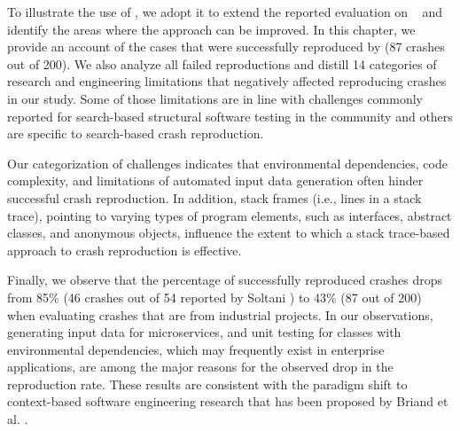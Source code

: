 To illustrate the use of \crashpack, we adopt it to extend the reported evaluation on \evocrash~\cite{soltani2017} and identify the areas where the approach can be improved.
In this chapter, we provide an account of the cases that were successfully reproduced by \evocrash (87 crashes out of 200). 
We also analyze all failed reproductions and distill 14 categories of research and engineering limitations that negatively affected reproducing crashes in our study. 
Some of those limitations are in line with challenges commonly reported for search-based structural software testing in the community \cite{xiao2011precise, McMinn2011, Fraser2014b} and others are specific to search-based crash reproduction.

Our categorization of challenges indicates that environmental dependencies, code complexity, and limitations of automated input data generation often hinder successful crash reproduction.
In addition, stack frames (i.e., lines in a stack trace), pointing to varying types of program elements, such as interfaces, abstract classes, and anonymous objects, influence the extent to which a stack trace-based approach to crash reproduction is effective.

Finally, we observe that the percentage of successfully reproduced crashes drops from 85\% (46 crashes out of 54 reported by Soltani \etal \cite{Soltani2018a}) to 43\% (87 out of 200) when evaluating crashes that are from industrial projects. 
In our observations, generating input data for microservices, and unit testing for classes with environmental dependencies, which may frequently exist in enterprise applications, are among the major reasons for the observed drop in the reproduction rate.
These results are consistent with the paradigm shift to context-based software engineering research that has been proposed by Briand et al. \cite{Briand2017a}.

